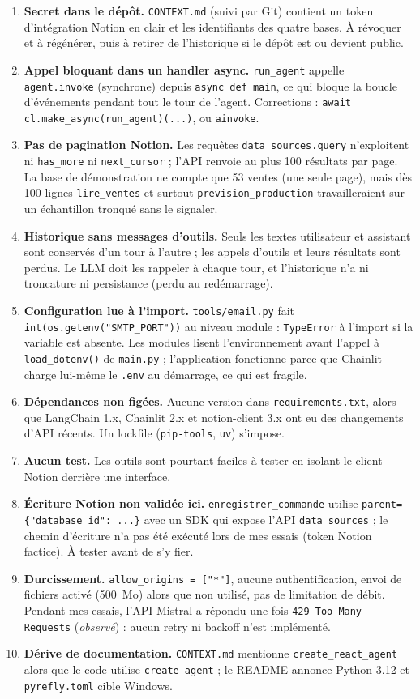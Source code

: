 \documentclass[10.5pt,a4paper]{article}
\newcommand{\code}[1]{\texttt{#1}}
\begin{document}
\begin{enumerate}[leftmargin=0.7cm]
  \item \textbf{Secret dans le dépôt.} \code{CONTEXT.md} (suivi par Git) contient un token d'intégration Notion en clair et les identifiants des quatre bases. À révoquer et à régénérer, puis à retirer de l'historique si le dépôt est ou devient public.
  \item \textbf{Appel bloquant dans un handler async.} \code{run\_agent} appelle \code{agent.invoke} (synchrone) depuis \code{async def main}, ce qui bloque la boucle d'événements pendant tout le tour de l'agent. Corrections : \code{await cl.make\_async(run\_agent)(...)}, ou \code{ainvoke}.
  \item \textbf{Pas de pagination Notion.} Les requêtes \code{data\_sources.query} n'exploitent ni \code{has\_more} ni \code{next\_cursor} ; l'API renvoie au plus 100 résultats par page. La base de démonstration ne compte que 53 ventes (une seule page), mais dès 100 lignes \code{lire\_ventes} et surtout \code{prevision\_production} travailleraient sur un échantillon tronqué sans le signaler.
  \item \textbf{Historique sans messages d'outils.} Seuls les textes utilisateur et assistant sont conservés d'un tour à l'autre ; les appels d'outils et leurs résultats sont perdus. Le LLM doit les rappeler à chaque tour, et l'historique n'a ni troncature ni persistance (perdu au redémarrage).
  \item \textbf{Configuration lue à l'import.} \code{tools/email.py} fait \code{int(os.getenv("SMTP\_PORT"))} au niveau module : \code{TypeError} à l'import si la variable est absente. Les modules lisent l'environnement avant l'appel à \code{load\_dotenv()} de \code{main.py} ; l'application fonctionne parce que Chainlit charge lui-même le \code{.env} au démarrage, ce qui est fragile.
  \item \textbf{Dépendances non figées.} Aucune version dans \code{requirements.txt}, alors que LangChain 1.x, Chainlit 2.x et notion-client 3.x ont eu des changements d'API récents. Un lockfile (\code{pip-tools}, \code{uv}) s'impose.
  \item \textbf{Aucun test.} Les outils sont pourtant faciles à tester en isolant le client Notion derrière une interface.
  \item \textbf{Écriture Notion non validée ici.} \code{enregistrer\_commande} utilise \code{parent=\{"database\_id": ...\}} avec un SDK qui expose l'API \code{data\_sources} ; le chemin d'écriture n'a pas été exécuté lors de mes essais (token Notion factice). À tester avant de s'y fier.
  \item \textbf{Durcissement.} \code{allow\_origins = ["*"]}, aucune authentification, envoi de fichiers activé (500~Mo) alors que non utilisé, pas de limitation de débit. Pendant mes essais, l'API Mistral a répondu une fois \code{429 Too Many Requests} (\textit{observé}) : aucun retry ni backoff n'est implémenté.
  \item \textbf{Dérive de documentation.} \code{CONTEXT.md} mentionne \code{create\_react\_agent} alors que le code utilise \code{create\_agent} ; le README annonce Python 3.12 et \code{pyrefly.toml} cible Windows.
\end{enumerate}
\end{document}

